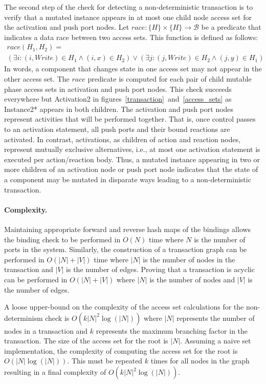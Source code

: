 The second step of the check for detecting a non-deterministic transaction is to verify that a mutated instance appears in at most one child node access set for the activation and push port nodes.
Let $\mathit{race}: \{ H \} \times \{ H \} \to \mathcal{B}$ be a predicate that indicates a data race between two access sets.
This function is defined as follows:
\begin{multline}
  \mathit{race} (H_1, H_2) = \\
  (\exists i : (i, \mathit{Write}) \in H_1 \land (i, x) \in H_2) \lor
  (\exists j : (j, \mathit{Write}) \in H_2 \land (j, y) \in H_1)
\end{multline}
In words, a component that changes state in one access set may not appear in the other access set.
The $\mathit{race}$ predicate is computed for each pair of child mutable phase access sets in activation and push port nodes.
This check succeeds everywhere but Activation2 in figures~\ref{transaction}~and~\ref{access_sets} as Instance2* appears in both children.
The activation and push port nodes represent activities that will be performed together.
That is, once control passes to an activation statement, all push ports and their bound reactions are activated.
In contrast, activations, as children of action and reaction nodes, represent mutually exclusive alternatives, i.e., at most one activation statement is executed per action/reaction body.
Thus, a mutated instance appearing in two or more children of an activation node or push port node indicates that the state of a component may be mutated in disparate ways leading to a non-deterministic transaction.

\paragraph{Complexity.}
Maintaining appropriate forward and reverse hash maps of the bindings allows the binding check to be performed in $O(N)$ time where $N$ is the number of ports in the system.
Similarly, the construction of a transaction graph can be performed in $O(|N| + |V|)$ time where $|N|$ is the number of nodes in the transaction and $|V|$ is the number of edges.
Proving that a transaction is acyclic can be performed in $O(|N| + |V|)$ where $|N|$ is the number of nodes and $|V|$ is the number of edges.

A loose upper-bound on the complexity of the access set calculations for the non-determinism check is $O(k |N|^2 \log (|N|))$ where $|N|$ represents the number of nodes in a transaction and $k$ represents the maximum branching factor in the transaction.
The size of the access set for the root is $|N|$.
Assuming a naive set implementation, the complexity of computing the access set for the root is $O(|N| \log (|N|))$.
This must be repeated $k$ times for all nodes in the graph resulting in a final complexity of $O(k |N|^2 \log (|N|))$.

